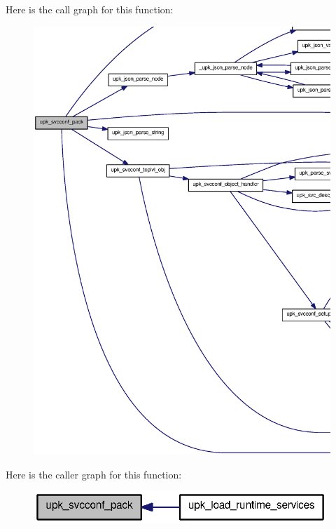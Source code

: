 Here is the call graph for this function:
\nopagebreak
\begin{figure}[H]
\begin{center}
\leavevmode
\includegraphics[width=400pt]{group__config__impl_gaef8b858931337dfe742cae5815857dec_cgraph}
\end{center}
\end{figure}




Here is the caller graph for this function:
\nopagebreak
\begin{figure}[H]
\begin{center}
\leavevmode
\includegraphics[width=314pt]{group__config__impl_gaef8b858931337dfe742cae5815857dec_icgraph}
\end{center}
\end{figure}


